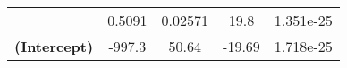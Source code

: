 \documentclass[]{book}
\theoremstyle{definition}
\theoremstyle{definition}
\theoremstyle{remark}
\begin{document}
\begin{longtable}[c]{@{}ccccc@{}}
\begin{minipage}[t]{0.37\columnwidth}
\strut\end{minipage} &
\begin{minipage}[t]{0.12\columnwidth}\centering\strut
0.5091
\strut\end{minipage} &
\begin{minipage}[t]{0.14\columnwidth}\centering\strut
0.02571
\strut\end{minipage} &
\begin{minipage}[t]{0.11\columnwidth}\centering\strut
19.8
\strut\end{minipage} &
\begin{minipage}[t]{0.11\columnwidth}\centering\strut
1.351e-25
\strut\end{minipage}\tabularnewline
\begin{minipage}[t]{0.37\columnwidth}\centering\strut
\textbf{(Intercept)}
\strut\end{minipage} &
\begin{minipage}[t]{0.12\columnwidth}\centering\strut
-997.3
\strut\end{minipage} &
\begin{minipage}[t]{0.14\columnwidth}\centering\strut
50.64
\strut\end{minipage} &
\begin{minipage}[t]{0.11\columnwidth}\centering\strut
-19.69
\strut\end{minipage} &
\begin{minipage}[t]{0.11\columnwidth}\centering\strut
1.718e-25
\strut\end{minipage}\tabularnewline
\bottomrule
\end{longtable}
\end{document}
